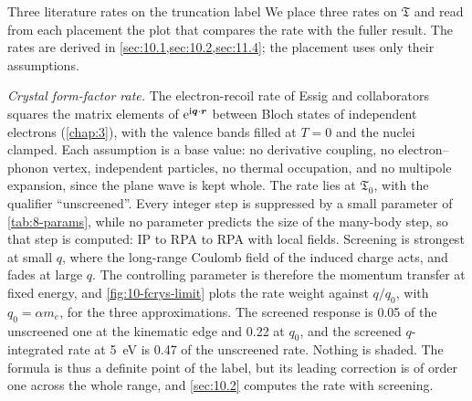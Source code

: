 \begin{workedexample}{Three literature rates on the truncation label}\label{we:9-place}
We place three rates on $\mathfrak{T}$ and read from each placement the plot that compares the rate with the fuller result. The rates are derived in \cref{sec:10.1,sec:10.2,sec:11.4}; the placement uses only their assumptions.

\emph{Crystal form-factor rate.} The electron-recoil rate of Essig and collaborators~\cite[Eqs.~(3.13) and (3.17)]{essig2016direct} squares the matrix elements of $\mathrm{e}^{\mathrm{i}\bm{q}\cdot\bm{r}}$ between Bloch states of independent electrons (\cref{chap:3}), with the valence bands filled at $T = 0$ and the nuclei clamped. Each assumption is a base value: no derivative coupling, no electron--phonon vertex, independent particles, no thermal occupation, and no multipole expansion, since the plane wave is kept whole. The rate lies at $\mathfrak{T}_0$, with the qualifier ``unscreened''. Every integer step is suppressed by a small parameter of \cref{tab:8-params}, while no parameter predicts the size of the many-body step, so that step is computed: IP to RPA to RPA with local fields. Screening is strongest at small $q$, where the long-range Coulomb field of the induced charge acts, and fades at large $q$. The controlling parameter is therefore the momentum transfer at fixed energy, and \cref{fig:10-fcrys-limit} plots the rate weight against $q/q_0$, with $q_0 = \alpha m_e$, for the three approximations. The screened response is 0.05 of the unscreened one at the kinematic edge and 0.22 at $q_0$, and the screened $q$-integrated rate at \SI{5}{eV} is 0.47 of the unscreened rate. Nothing is shaded. The formula is thus a definite point of the label, but its leading correction is of order one across the whole range, and \cref{sec:10.2} computes the rate with screening.


\end{workedexample}
